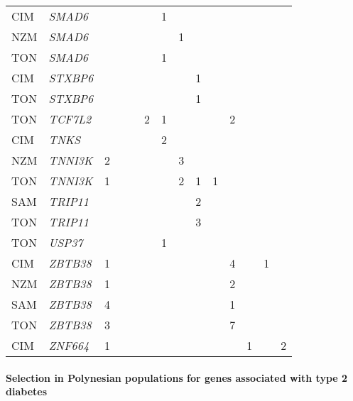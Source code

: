 \documentclass[twoside,openright]{report}
\let\oldparagraph\paragraph
\renewcommand{\paragraph}[1]{\oldparagraph{#1}\mbox{}}
\begin{document}
\begin{ThreePartTable}
\begin{longtable}[t]{llllllllllllll}
CIM & \em{SMAD6} &  &  &  &  & 1 &  &  &  &  &  &  & \\
NZM & \em{SMAD6} &  &  &  &  &  & 1 &  &  &  &  &  & \\
TON & \em{SMAD6} &  &  &  &  & 1 &  &  &  &  &  &  & \\
CIM & \em{STXBP6} &  &  &  &  &  &  & 1 &  &  &  &  & \\
TON & \em{STXBP6} &  &  &  &  &  &  & 1 &  &  &  &  & \\
TON & \em{TCF7L2} &  &  &  & 2 & 1 &  &  &  & 2 &  &  & \\
CIM & \em{TNKS} &  &  &  &  & 2 &  &  &  &  &  &  & \\
NZM & \em{TNNI3K} & 2 &  &  &  &  & 3 &  &  &  &  &  & \\
TON & \em{TNNI3K} & 1 &  &  &  &  & 2 & 1 & 1 &  &  &  & \\
SAM & \em{TRIP11} &  &  &  &  &  &  & 2 &  &  &  &  & \\
TON & \em{TRIP11} &  &  &  &  &  &  & 3 &  &  &  &  & \\
TON & \em{USP37} &  &  &  &  & 1 &  &  &  &  &  &  & \\
CIM & \em{ZBTB38} & 1 &  &  &  &  &  &  &  & 4 &  & 1 & \\
NZM & \em{ZBTB38} & 1 &  &  &  &  &  &  &  & 2 &  &  & \\
SAM & \em{ZBTB38} & 4 &  &  &  &  &  &  &  & 1 &  &  & \\
TON & \em{ZBTB38} & 3 &  &  &  &  &  &  &  & 7 &  &  & \\
CIM & \em{ZNF664} & 1 &  &  &  &  &  &  &  &  & 1 &  & 2\\*
\end{longtable}
\end{ThreePartTable}

\endgroup{}

\paragraph{Selection in Polynesian populations for genes associated with
type 2
diabetes}\label{selection-in-polynesian-populations-for-genes-associated-with-type-2-diabetes}
\end{document}
